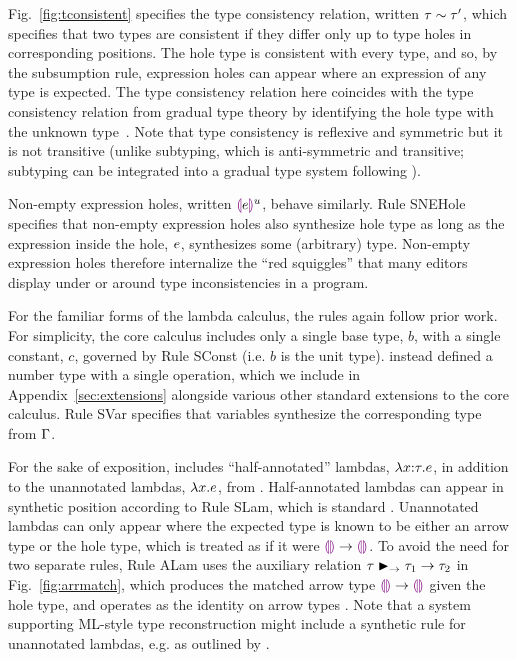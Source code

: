 


Fig.~\ref{fig:tconsistent} specifies the type consistency relation, written $\tau \sim \tau'$, which specifies that two types are consistent if they differ only up to type holes in corresponding positions. The hole type is consistent with every type, and so, by the subsumption rule, expression holes can appear where an expression of any type is expected. The type consistency relation here coincides with the type consistency relation from gradual type theory by identifying the hole type with the unknown type~\cite{Siek06a}. Note that type consistency is reflexive and symmetric but it is not transitive (unlike subtyping, which is anti-symmetric and transitive; subtyping can be integrated into a gradual type system following \citet{Siek:2007qy}). 

Non-empty expression holes, written $\textcolor{violet}{\llparenthesis}e\textcolor{violet}{\rrparenthesis}^{u}$, behave similarly. Rule {SNEHole} specifies that non-empty expression holes also synthesize hole type as long as the expression inside the hole, $e$, synthesizes some (arbitrary) type. Non-empty expression holes therefore internalize the ``red squiggles'' that many editors display under or around type inconsistencies in a program.

For the familiar forms of the lambda calculus, the rules again follow prior work. For simplicity, the core calculus includes only a single base type, $b$, with a single constant, $c$, governed by Rule {SConst} (i.e. $b$ is the unit type). \Hazelnut instead defined a number type with a single operation, which we include in Appendix~\ref{sec:extensions} alongside various other standard extensions to the core calculus. 
%
Rule {SVar} specifies that variables synthesize the corresponding type from $\Gamma$. 

For the sake of exposition, \HazelnutLive includes ``half-annotated'' lambdas, $\lambda x{:}\tau.e$, in addition to the unannotated lambdas, $\lambda x.e$, from \Hazelnut.  Half-annotated lambdas can appear in synthetic position  according to Rule {SLam}, which is standard \cite{Chlipala:2005da}. Unannotated lambdas can only appear where the expected type is known to be either an arrow type or the hole type, which is treated as if it were $\textcolor{violet}{\llparenthesis}\textcolor{violet}{\rrparenthesis} \rightarrow \textcolor{violet}{\llparenthesis}\textcolor{violet}{\rrparenthesis}$. To avoid the need for two separate rules, Rule {ALam} uses the auxiliary relation $\tau \blacktriangleright_{\rightarrow} \tau_1 \rightarrow \tau_2$ in Fig.~\ref{fig:arrmatch}, which produces the matched arrow type $\textcolor{violet}{\llparenthesis}\textcolor{violet}{\rrparenthesis} \rightarrow \textcolor{violet}{\llparenthesis}\textcolor{violet}{\rrparenthesis}$ given the hole type, and operates as the identity on arrow types \cite{DBLP:conf/snapl/SiekVCB15,DBLP:conf/popl/GarciaC15}. Note that a system supporting ML-style type reconstruction \cite{damas1982principal} might include a synthetic rule for unannotated lambdas, e.g. as outlined by \citet{DBLP:conf/icfp/DunfieldK13}. 

